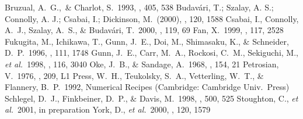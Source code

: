 Bruzual, A.~G.,~\& Charlot, S.~1993, \apj, {405}, 538
Budav\'ari, T.; Szalay, A. S.; Connolly, A. J.; Csabai, I.; Dickinson,
M.~(2000), \aj, 120, 1588
Csabai, I., Connolly, A.~J., Szalay, A.~S., \& Budav\'ari,
T.~2000, \aj, 119, 69
Fan, X.~1999, \aj, 117, 2528
Fukugita, M., Ichikawa, T., Gunn, J.~E., Doi, M., Shimasaku, K., \&
Schneider, D.~P.~1996, \aj, 111, 1748
Gunn, J.~E., Carr, M.~A., Rockosi, C.~M., Sekiguchi, M., {\it et al.}~1998, \aj, 116, 3040
Oke, J.~B., \& Sandage, A.~1968, \apj, 154, 21
Petrosian, V.~1976, \apj, 209, L1
Press, W.~H., Teukolsky, S.~A., Vetterling, W.~T., \& Flannery,
B.~P.~1992, Numerical Recipes (Cambridge: Cambridge Univ.~Press)
Schlegel, D.~J., Finkbeiner, D.~P., \& Davis, M.~1998, \apj, 500, 525
Stoughton, C., {\it et al.}~2001, in preparation
York, D., {\it et al.}~2000, \aj, 120, 1579

